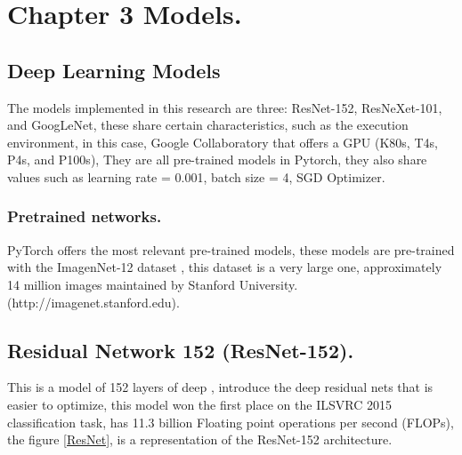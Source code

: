 \documentclass[letterpaper,12pt,openright,oneside]{article}
\begin{document}





\pagebreak
     







\section{Chapter 3  Models.}
\subsection{Deep Learning Models}
The models implemented in this research are three: ResNet-152, ResNeXet-101, and GoogLeNet, these share certain characteristics, such as the execution environment, in this case, Google Collaboratory that offers a GPU (K80s, T4s, P4s, and P100s), They are all pre-trained models in Pytorch, they also share values such as learning rate = 0.001, batch size = 4, SGD Optimizer.


\subsubsection{Pretrained networks.}
PyTorch offers the most relevant pre-trained models, these models are pre-trained with the ImagenNet-12 dataset \cite{Eli}, this dataset is a very large one, approximately 14 million images maintained by Stanford University. (http://imagenet.stanford.edu).\\



\subsection{Residual Network 152 (ResNet-152).} 
This is a model of 152 layers of deep \cite{he2015deep}, introduce the deep residual nets that is easier to optimize, this model won the first place on the ILSVRC 2015 classification task, has 11.3 billion Floating point operations per second (FLOPs), the figure \ref{ResNet}, is a representation of the ResNet-152 architecture.
\end{document}
